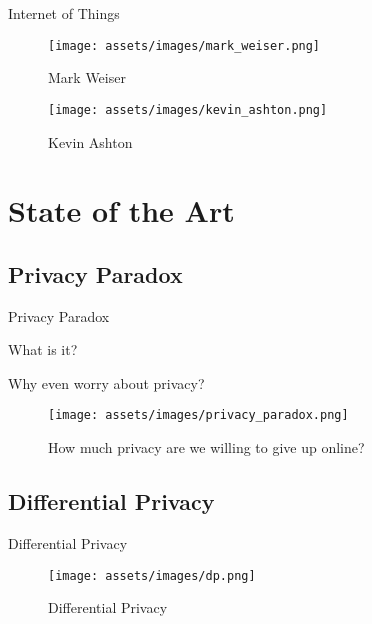 \documentclass[xcolor={svgnames},aspectratio=169]{beamer}
\begin{document}
\begin{frame}{Internet of Things}
    \begin{multicols}{2}
        \begin{figure}
            \centering\texttt{[image: assets/images/mark\_weiser.png]}
            \caption{Mark Weiser \cite{weiser1991computer}}
        \end{figure}

        \columnbreak
        \begin{figure}
            \centering\texttt{[image: assets/images/kevin\_ashton.png]}
            \caption{Kevin Ashton \cite{KevinThat}}
        \end{figure}
    \end{multicols}
\end{frame}

\section{State of the Art}

\subsection{Privacy Paradox}

\begin{frame}{Privacy Paradox}
    \begin{multicols}{2}
        \vspace*{\fill}
        What is it?

        \vspace*{\fill}
        Why even worry about privacy?
        \vspace*{\fill}

        \columnbreak
        \begin{figure}
            \centering\texttt{[image: assets/images/privacy\_paradox.png]}
            \caption{How much privacy are we willing to give up online? \cite{ClareParadox}}
        \end{figure}
    \end{multicols}
\end{frame}

\subsection{Differential Privacy}

\begin{frame}{Differential Privacy}
    \begin{figure}
        \centering\texttt{[image: assets/images/dp.png]}
        \caption{Differential Privacy \cite{WintonDifferential}}
    \end{figure}
\end{frame}
\end{document}
